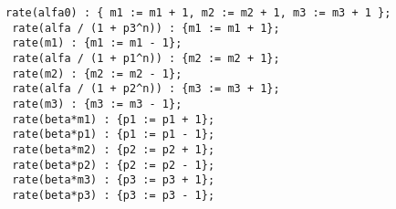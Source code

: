 \begin{lstlisting}[style=GROSRC]
 rate(alfa0) : { m1 := m1 + 1, m2 := m2 + 1, m3 := m3 + 1 };
 rate(alfa / (1 + p3^n)) : {m1 := m1 + 1};
 rate(m1) : {m1 := m1 - 1};
 rate(alfa / (1 + p1^n)) : {m2 := m2 + 1};
 rate(m2) : {m2 := m2 - 1};
 rate(alfa / (1 + p2^n)) : {m3 := m3 + 1};
 rate(m3) : {m3 := m3 - 1};
 rate(beta*m1) : {p1 := p1 + 1};
 rate(beta*p1) : {p1 := p1 - 1};
 rate(beta*m2) : {p2 := p2 + 1};
 rate(beta*p2) : {p2 := p2 - 1};
 rate(beta*m3) : {p3 := p3 + 1};
 rate(beta*p3) : {p3 := p3 - 1};
\end{lstlisting}